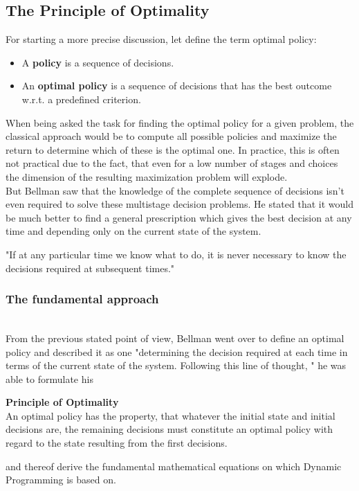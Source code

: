 \documentclass[conference]{IEEEtran}
\begin{document}
\subsection{The Principle of Optimality}
For starting a more precise discussion, let define the term optimal policy:
\begin{itemize}
\item A \textbf{policy} is a sequence of decisions.
\item An \textbf{optimal policy} is a sequence of decisions that has the best outcome w.r.t. a predefined criterion.
\end{itemize}
When being asked the task for finding the optimal policy for a given problem, the classical approach would be to compute all possible policies and maximize the return to determine which of these is the optimal one. In practice, this is often not practical due to the fact, that even for a low number of stages and choices the dimension of the resulting maximization problem will explode.
\\
But Bellman saw that the knowledge of the complete sequence of decisions isn't even required to solve these multistage decision problems. He stated that it would be much better to find a general prescription which gives the best decision at any time and depending only on the current state of the system.
\begin{center}
"If at any particular time we know what to do, it is never necessary to know the decisions required at subsequent times."
\end{center}
\cite{Bellman.30.07.1954}
\subsubsection{The fundamental approach}
\quad \\
From the previous stated point of view, Bellman went over to define an optimal policy and described it as one "determining the decision required at each time in terms of the current state of the system. Following this line of thought, "\cite{Bellman.30.07.1954} he was able to formulate his 

\begin{center}
\textbf{Principle of Optimality}
\\
An optimal policy has the property, that whatever the initial state and initial decisions are, the remaining decisions must constitute an optimal policy with regard to the state resulting from the first decisions.
\end{center} 
and thereof derive the fundamental mathematical equations on which Dynamic Programming is based on. \cite{Bellman.30.07.1954}
\\
\end{document}
